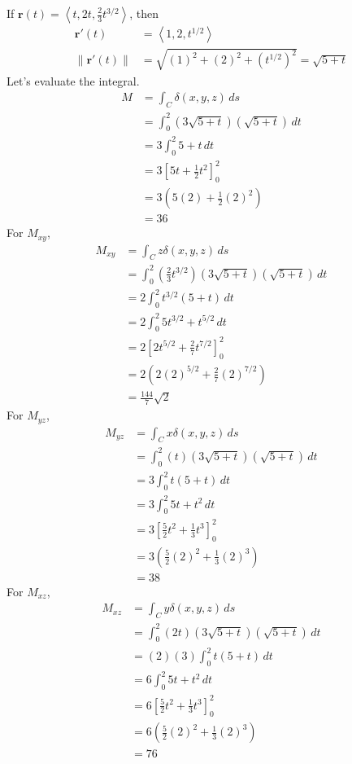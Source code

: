 \documentclass{article}
\newcommand{\lrp}[1]{\left( #1 \right)}
\newcommand{\lra}[1]{\left\langle #1 \right\rangle}
\newcommand{\lrb}[1]{\left[ #1 \right]}
\newcommand{\norm}[1]{\left\lVert #1 \right\rVert}
\renewcommand{\r}[0]{\mathbf{r}}
\begin{document}
If $\r(t)=\lra{t,2t,\frac{2}{3}t^{3/2}}$, then
\begin{align*}
    \r'(t)&=\lra{1,2,t^{1/2}}\\
    \norm{\r'(t)}&=\sqrt{(1)^2+(2)^2+\lrp{t^{1/2}}^2}=\sqrt{5+t}
\end{align*}
Let's evaluate the integral.
\begin{align*}
    M&=\int_C \delta(x,y,z)\,ds\\
    &=\int_0^2 \lrp{3\sqrt{5+t}}\lrp{\sqrt{5+t}}\,dt\\
    &=3\int_0^2 5+t\,dt\tag{we can move constants outside}\\
    &=3\lrb{5t+\frac{1}{2}t^2}_0^2\\
    &=3\lrp{5(2)+\frac{1}{2}(2)^2}\\
    &=36
\end{align*}
For $M_{xy}$,
\begin{align*}
    M_{xy}&=\int_C z\delta(x,y,z)\,ds\\
    &=\int_0^2 \lrp{\frac{2}{3}t^{3/2}}\lrp{3\sqrt{5+t}}\lrp{\sqrt{5+t}}\,dt\\
    &=2\int_0^2 t^{3/2}(5+t)\,dt\tag{we can move constants outside}\\
    &=2\int_0^2 5t^{3/2}+t^{5/2}\,dt\\
    &=2\lrb{2t^{5/2}+\frac{2}{7}t^{7/2}}_0^2\\
    &=2\lrp{2(2)^{5/2}+\frac{2}{7}(2)^{7/2}}\\
    &=\frac{144}{7}\sqrt{2}\tag{use a calculator}
\end{align*}
For $M_{yz}$,
\begin{align*}
    M_{yz}&=\int_C x\delta(x,y,z)\,ds\\
    &=\int_0^2 \lrp{t}\lrp{3\sqrt{5+t}}\lrp{\sqrt{5+t}}\,dt\\
    &=3\int_0^2 t(5+t)\,dt\tag{we can move constants outside}\\
    &=3\int_0^2 5t + t^2\,dt\\
    &=3\lrb{\frac{5}{2}t^2+\frac{1}{3}t^3}_0^2\\
    &=3\lrp{\frac{5}{2}(2)^2+\frac{1}{3}(2)^3}\\
    &=38\tag{use a calculator}
\end{align*}
For $M_{xz}$,
\begin{align*}
     M_{xz}&=\int_C y\delta(x,y,z)\,ds\\
    &=\int_0^2 \lrp{2t}\lrp{3\sqrt{5+t}}\lrp{\sqrt{5+t}}\,dt\\
    &=(2)(3)\int_0^2 t(5+t)\,dt\tag{we can move constants outside}\\
    &=6\int_0^2 5t+t^2\,dt\\
     &=6\lrb{\frac{5}{2}t^2+\frac{1}{3}t^3}_0^2\\
    &=6\lrp{\frac{5}{2}(2)^2+\frac{1}{3}(2)^3}\\
    &=76\tag{use a calculator}
\end{align*}
\end{document}
